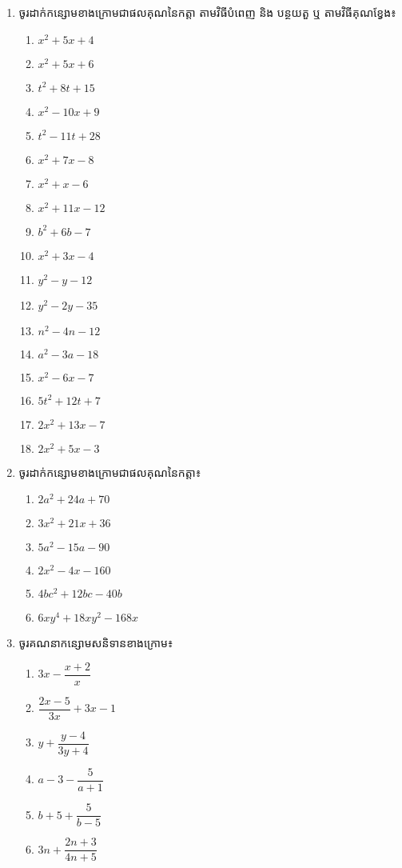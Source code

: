 \begin{enumerate}
\item ចូរដាក់កន្សោមខាងក្រោមជាផលគុណនៃកត្តា តាមវិធីបំពេញ និង បន្ថយតួ ឬ តាមវិធីគុណខ្វែង៖
\begin{multicols}{4}
\begin{enumerate}[label=\alph*.]
\item $x^2+5x+4$
\item $x^2+5x+6$
\item $t^2+8t+15$
\item $x^2-10x+9$
\item $t^2-11t+28$
\item $x^2+7x-8$
\item $x^2+x-6$
\item $x^2+11x-12$
\item $b^2+6b-7$
\item $x^2+3x-4$
\item $y^2-y-12$
\item $y^2-2y-35$
\item $n^2-4n-12$
\item $a^2-3a-18$
\item $x^2-6x-7$
\item $5t^2+12t+7$
\item $2x^2+13x-7$
\item $2x^2+5x-3$
\end{enumerate}
\end{multicols}

\item ចូរដាក់កន្សោមខាងក្រោមជាផលគុណនៃកត្តា៖
\begin{multicols}{3}
\begin{enumerate}[label=\alph*.]
\item $2a^2+24a+70$
\item $3x^2+21x+36$
\item $5a^2-15a-90$
\item $2x^2-4x-160$
\item $4bc^2+12bc-40b$
\item $6xy^4+18xy^2-168x$
\end{enumerate}
\end{multicols}

\item ចូរគណនាកន្សោមសនិទានខាងក្រោម៖
\begin{multicols}{3}
\begin{enumerate}[label=\alph*.]
\item $3x-\dfrac{x+2}{x}$
\item $\dfrac{2x-5}{3x}+3x-1$
\item $y+\dfrac{y-4}{3y+4}$
\item $a-3-\dfrac{5}{a+1}$
\item $b+5+\dfrac{5}{b-5}$
\item $3n+\dfrac{2n+3}{4n+5}$
\end{enumerate}
\end{multicols}


\end{enumerate}
